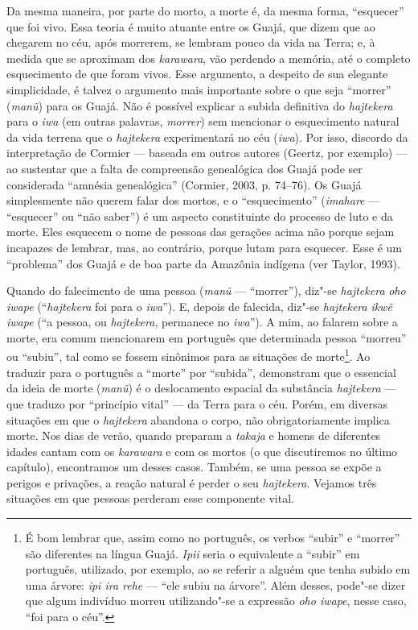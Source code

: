 Da mesma maneira, por parte do morto, a morte é, da mesma forma,
``esquecer'' que foi vivo. Essa teoria é muito atuante entre os Guajá, que
dizem que ao chegarem no céu, após morrerem, se lembram pouco da vida na
Terra; e, à medida que se aproximam dos \emph{karawara}, vão perdendo a
memória, até o completo esquecimento de que foram vivos. Esse argumento,
a despeito de sua elegante simplicidade, é talvez o argumento mais
importante sobre o que seja ``morrer'' (\emph{manũ}) para os Guajá. Não é
possível explicar a subida definitiva do \emph{hajtekera} para o
\emph{iwa} (em outras palavras, \emph{morrer}) sem mencionar o
esquecimento natural da vida terrena que o \emph{hajtekera}
experimentará no céu (\emph{iwa}). Por isso, discordo da interpretação
de Cormier --- baseada em outros autores (Geertz, por exemplo) --- ao
sustentar que a falta de compreensão genealógica dos Guajá pode ser
considerada ``amnésia genealógica'' (Cormier, 2003, p. 74--76). Os Guajá
simplesmente não querem falar dos mortos, e o ``esquecimento''
(\emph{imahare} --- ``esquecer'' ou ``não saber'') é um aspecto constituinte
do processo de luto e da morte. Eles esquecem o nome de pessoas das
gerações acima não porque sejam incapazes de lembrar, mas, ao contrário,
porque lutam para esquecer. Esse é um ``problema'' dos Guajá e de boa
parte da Amazônia indígena (ver Taylor, 1993).

Quando do falecimento de uma pessoa (\emph{manũ} --- ``morrer''), diz"-se
\emph{hajtekera} \emph{oho iwape} (``\emph{hajtekera} foi para o
\emph{iwa}''). E, depois de falecida, diz"-se \emph{hajtekera} \emph{ikwẽ
iwape} (``a pessoa, ou \emph{hajtekera}, permanece no \emph{iwa}''). A
mim, ao falarem sobre a morte, era comum mencionarem em português que
determinada pessoa ``morreu'' ou ``subiu'', tal como se fossem sinônimos
para as situações de morte\footnote{É bom lembrar que, assim como no
  português, os verbos ``subir'' e ``morrer'' são diferentes na língua
  Guajá. \emph{Ipii} seria o equivalente a ``subir'' em português,
  utilizado, por exemplo, ao se referir a alguém que tenha subido em uma
  árvore: \emph{ipi ira rehe} --- ``ele subiu na árvore''. Além desses,
  pode"-se dizer que algum indivíduo morreu utilizando"-se a expressão
  \emph{oho iwape}, nesse caso, ``foi para o céu''.}. Ao traduzir para o
português a ``morte'' por ``subida'', demonstram que o essencial da ideia de
morte (\emph{manũ}) é o deslocamento espacial da substância
\emph{hajtekera} --- que traduzo por ``princípio vital'' --- da Terra para o
céu. Porém, em diversas situações em que o \emph{hajtekera} abandona o
corpo, não obrigatoriamente implica morte. Nos dias de verão, quando
preparam a \emph{takaja} e homens de diferentes idades cantam com os
\emph{karawara} e com os mortos (o que discutiremos no último capítulo),
encontramos um desses casos. Também, se uma pessoa se expõe a perigos e
privações, a reação natural é perder o seu \emph{hajtekera}. Vejamos
três situações em que pessoas perderam esse componente vital.

